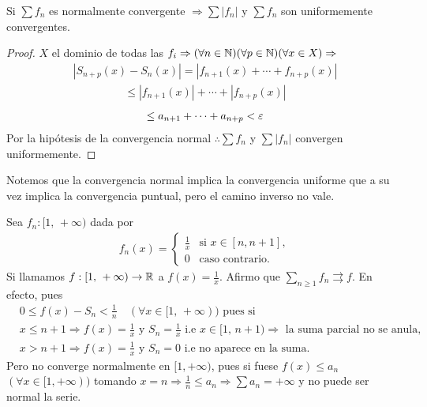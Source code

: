\begin{theorem}
  Si $\sum f_n$ es normalmente convergente $\Rightarrow \sum |f_n|$ y $\sum f_n$ son uniformemente convergentes.
  \begin{proof}
    $X$ el dominio de todas las $f_i \Rightarrow (\forall n \in \mathbb{N})(\forall p \in \mathbb{N})(\forall x \in X) \Rightarrow$ \begin{align*}
      |S_{n + p}(x) - S_n(x)| = |f_{n+1}(x) + \cdots + f_{n + p}(x)|
    \end{align*}
    \begin{align*}
      \leq |f_{n+1}(x)| + \cdots + |f_{n+p}(x)|
    \end{align*}
    \begin{align*}
      \leq a_{n+1} + \cdots + a_{n+p} < \varepsilon
    \end{align*}
    Por la hipótesis de la convergencia normal $\therefore \sum f_n$ y $\sum |f_n|$ convergen uniformemente.
  \end{proof}
\end{theorem}

Notemos que la convergencia normal implica la convergencia uniforme que a su vez implica la convergencia puntual, pero el camino inverso no vale.

\begin{eg}
  Sea $f_n : [1\text{, }+\infty)$ dada por \begin{align*}
    f_n(x) = \begin{cases}
               \frac{1}{x} & \text{si } x \in [n, n+1], \\
               0           & \text{caso contrario.}
             \end{cases}
  \end{align*}
  Si llamamos $f: [1\text{, } +\infty) \to \mathbb{R}$ a $f(x) = \frac{1}{x}$.
  Afirmo que $\sum_{n \geq 1} f_n \rightrightarrows f$. En efecto, pues
  \begin{align*}
     & 0 \leq f(x) - S_n < \frac{1}{n} \quad (\forall x \in [1\text{, } +\infty)) \text{ pues si }                                                                  \\
     & x \leq n+1 \Rightarrow f(x) = \frac{1}{x} \text{ y } S_n = \frac{1}{x} \text{ i.e } x \in [1\text{, } n+1) \Rightarrow \text{ la suma parcial no se anula, } \\
     & x > n+1 \Rightarrow f(x) = \frac{1}{x} \text{ y } S_n = 0 \text{ i.e no aparece en la suma.}
  \end{align*}
  Pero no converge normalmente en $[1, +\infty)$, pues si fuese $f(x) \leq a_n$ $(\forall x \in [1, +\infty))$ tomando $x = n \Rightarrow \frac{1}{n} \leq a_n \Rightarrow \sum a_n = +\infty$ y no puede ser normal la serie.
\end{eg}

